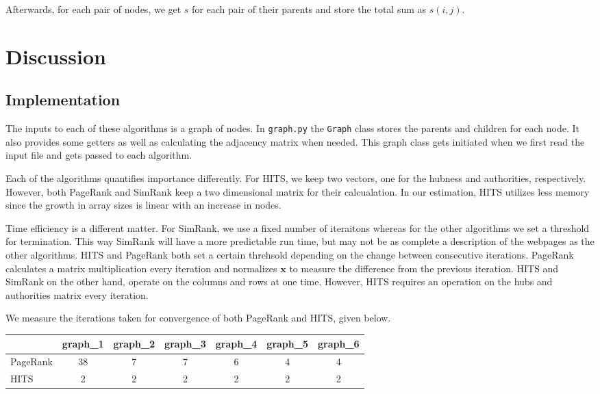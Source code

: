 \documentclass[
  paper=a4,
,captions=tableheading
]{scrartcl}
\newcommand{\passthrough}[1]{#1}
\begin{document}
Afterwards, for each pair of nodes, we get \(s\) for each pair of their
parents and store the total sum as \(s(i,j)\).

\hypertarget{discussion}{%
\section{Discussion}\label{discussion}}

\hypertarget{implementation}{%
\subsection{Implementation}\label{implementation}}

The inputs to each of these algorithms is a graph of nodes. In
\passthrough{\lstinline!graph.py!} the \passthrough{\lstinline!Graph!}
class stores the parents and children for each node. It also provides
some getters as well as calculating the adjacency matrix when needed.
This graph class gets initiated when we first read the input file and
gets passed to each algorithm.

Each of the algorithms quantifies importance differently. For HITS, we
keep two vectors, one for the hubness and authorities, respectively.
However, both PageRank and SimRank keep a two dimensional matrix for
their calcualation. In our estimation, HITS utilizes less memory since
the growth in array sizes is linear with an increase in nodes.

Time efficiency is a different matter. For SimRank, we use a fixed
number of iteraitons whereas for the other algorithms we set a threshold
for termination. This way SimRank will have a more predictable run time,
but may not be as complete a description of the webpages as the other
algorithms. HITS and PageRank both set a certain threhsold depending on
the change between consecutive iterations. PageRank calculates a matrix
multiplication every iteration and normalizes \(\mathbf{x}\) to measure
the difference from the previous iteration. HITS and SimRank on the
other hand, operate on the columns and rows at one time. However, HITS
requires an operation on the hubs and authorities matrix every
iteration.

We measure the iterations taken for convergence of both PageRank and
HITS, given below.

\begin{longtable}[]{@{}lcccccc@{}}
\toprule
& graph\_1 & graph\_2 & graph\_3 & graph\_4 & graph\_5 & graph\_6 \\
\midrule
\endhead
PageRank & 38 & 7 & 7 & 6 & 4 & 4 \\
HITS & 2 & 2 & 2 & 2 & 2 & 2 \\
\bottomrule
\end{longtable}
\end{document}
